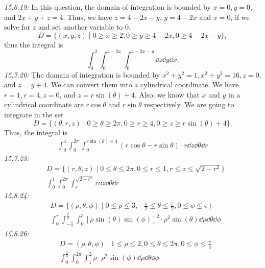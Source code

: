 \documentclass[8pt,twocolumn]{article}
\begin{document}
\begin{Answer}[number=19]
  \emph{15.6.19:}
  In this question, the domain of integration is bounded by $x=0, y=0$, and
  $2x+y+z=4$. Thus, we have $z=4-2x-y$, $y=4-2x$ and $x=0$, if we solve for $z$
  and set another variable to $0$.
  \[D = \{(x,y,z) \mid 0\ge x\ge 2, 0\ge y\ge 4-2x, 0\ge 4-2x-y\},\] thus the
  integral is
  \[\int_0^2\int_0^{4-2x}\int_0^{4-2x-y}\dd{z}\dd{y}\dd{x}.\]
  \emph{15.7.20:}
  The domain of integration is bounded by $x^2+y^2=1, x^2+y^2=16, z=0$, and
  $z=y+4$. We can convert them into a cylindrical coordinate. We have $r=1,
  r=4, z=0$, and $z=r\sin(\theta)+4$. Also, we know that $x$ and $y$ in a
  cylindrical coordinate are $r\cos\theta$ and $r\sin\theta$ respectively. We
  are going to integrate in the set
  \[
    D = \{(\theta, r, z) \mid 0\ge\theta\ge2\pi, 0\ge r\ge4, 0\ge z\ge
    r\sin(\theta)+4\}.
  \]
  Thus, the integral is
  \begin{align*}
    \int_0^4\int_0^{2\pi}\int_0^{r\sin(\theta)+4} (r\cos\theta-
    r\sin\theta)\cdot r\dd{z}\dd{\theta}\dd{r}
  \end{align*}
  \emph{15.7.23:}
  \begin{align*}
    &D = \{(r,\theta,z) \mid 0\le \theta\le2\pi, 0\le r\le 1, r\le z\le
    \sqrt{2-r^2}\} \\
    &\int_0^1\int_0^{2\pi}\int_r^{\sqrt{2-r^2}} r\dd{z}\dd{\theta}\dd{r}
  \end{align*}
  \emph{15.8.24:}
  \begin{align*}
    &D = \{(\rho, \theta, \phi) \mid 0\le \rho \le 3, -\frac{\pi}{2}\le
    \theta\le \frac{\pi}{2}, 0\le\phi\le \pi \} \\
    &\int_0^{\pi}\int_{-\frac{\pi}{2}}^{\frac{\pi}{2}}\int_0^3
    \left[\rho\sin(\theta)\sin(\phi)\right]^2\cdot\rho^2\sin(\theta) \dd{\rho}\dd{\theta}\dd{\phi}
  \end{align*}
  \emph{15.8.26:}
  \begin{align*}
    &D = {(\rho, \theta, \phi)\mid1\le\rho\le2, 0\le\theta\le2\pi,
    0\le\phi\le\frac{\pi}{4}} \\
    &\int_0^{\frac{\pi}{4}}\int_0^{2\pi}\int_1^2 \rho \cdot \rho^2\sin(\phi) \dd{\rho}\dd{\theta}\dd{\phi}
  \end{align*}
\end{Answer}
\end{document}
